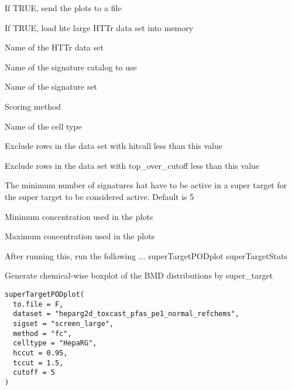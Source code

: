 \documentclass[letterpaper]{book}
\begin{document}
%
\begin{Arguments}
\begin{ldescription}
\item[\code{to.file}] If TRUE, send the plots to a file

\item[\code{do.load}] If TRUE, load hte large HTTr data set into memory

\item[\code{dataset}] Name of the HTTr data set

\item[\code{sigcatalog}] Name of the signature catalog to use

\item[\code{sigset}] Name of the signature set

\item[\code{method}] Scoring method

\item[\code{celltype}] Name of the cell type

\item[\code{hccut}] Exclude rows in the data set with hitcall less than this value

\item[\code{tccut}] Exclude rows in the data set with top\_over\_cutoff less than this value

\item[\code{cutoff}] The minimum number of signatures hat have to be active in a super
target for the super target to be considered active. Default is 5

\item[\code{minconc}] Minimum concentration used in the plots

\item[\code{maxconc}] Maximum concentration used in the plots

After running this, run the following ...
superTargetPODplot
superTargetStats
\end{ldescription}
\end{Arguments}
%
\begin{Description}\relax
Generate chemical-wise boxplot of the BMD distributions by super\_target
\end{Description}
%
\begin{Usage}
\begin{verbatim}
superTargetPODplot(
  to.file = F,
  dataset = "heparg2d_toxcast_pfas_pe1_normal_refchems",
  sigset = "screen_large",
  method = "fc",
  celltype = "HepaRG",
  hccut = 0.95,
  tccut = 1.5,
  cutoff = 5
)
\end{verbatim}
\end{Usage}
\end{document}
